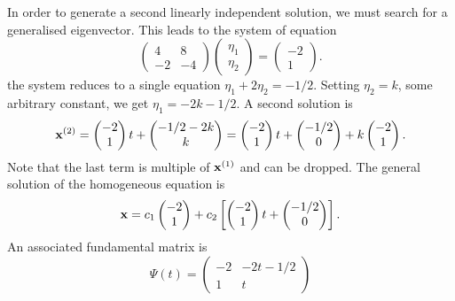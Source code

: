 \documentclass[11pt,a4paper]{article}
\begin{document}
\begin{enumerate}
$$		$$
		In order to generate a second linearly independent solution, we must search for a generalised eigenvector. This leads to the system of equation
		$$
		\begin{pmatrix}
			4 & 8\\
			-2 & -4
		\end{pmatrix}
		\begin{pmatrix}
			\eta_1\\
			\eta_2
		\end{pmatrix} =
		\begin{pmatrix}
			-2\\
			1
		\end{pmatrix}.
		$$
		the system reduces to a single equation $\eta_1 + 2\eta_2 = -1/2$. Setting $\eta_2 = k$, some arbitrary constant, we get $\eta_1 = -2k - 1/2$. A second solution is
		$$
		\vb{x}^{(2)} =
		\begin{pmatrix}
			-2\\
			1
		\end{pmatrix}t +
		\begin{pmatrix}
			-1/2-2k\\
			k
		\end{pmatrix} =
		\begin{pmatrix}
			-2\\
			1
		\end{pmatrix}t +
		\begin{pmatrix}
			-1/2\\
			0
		\end{pmatrix} + k
		\begin{pmatrix}
			-2\\
			1
		\end{pmatrix}.
		$$
		Note that the last term is multiple of $\vb{x}^{(1)}$ and can be dropped. The general solution of the homogeneous equation is
		$$
		\vb{x} = c_1
		\begin{pmatrix}
			-2\\
			1
		\end{pmatrix} + c_2
		\left[
			\begin{pmatrix}
				-2\\
				1
			\end{pmatrix}t +
			\begin{pmatrix}
				-1/2\\
				0
			\end{pmatrix}
		\right].
		$$
		An associated fundamental matrix is
		$$
		\Psi(t) =
		\begin{pmatrix}
			-2 & -2t-1/2\\
			1 & t

\end{pmatrix}$$
\end{enumerate}
\end{document}
